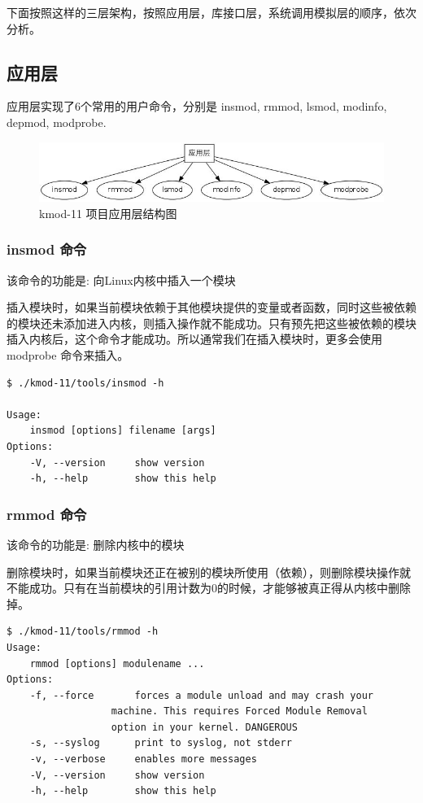 下面按照这样的三层架构，按照应用层，库接口层，系统调用模拟层的顺序，依次分析。

\subsection{应用层}

应用层实现了6个常用的用户命令，分别是 insmod, rmmod, lsmod, modinfo,
depmod, modprobe.

\begin{figure}[htbp]
\centering
\includegraphics{./figures/1-app.jpg}
\caption{kmod-11 项目应用层结构图}
\end{figure}

\subsubsection{insmod 命令}

该命令的功能是: 向Linux内核中插入一个模块

插入模块时，如果当前模块依赖于其他模块提供的变量或者函数，同时这些被依赖的模块还未添加进入内核，则插入操作就不能成功。只有预先把这些被依赖的模块插入内核后，这个命令才能成功。所以通常我们在插入模块时，更多会使用
modprobe 命令来插入。

{\begin{shaded}\begin{verbatim}
$ ./kmod-11/tools/insmod -h

Usage:
    insmod [options] filename [args]
Options:
    -V, --version     show version
    -h, --help        show this help
\end{verbatim}\end{shaded}}
\subsubsection{rmmod 命令}

该命令的功能是: 删除内核中的模块

删除模块时，如果当前模块还正在被别的模块所使用（依赖），则删除模块操作就不能成功。只有在当前模块的引用计数为0的时候，才能够被真正得从内核中删除掉。

{\begin{shaded}\begin{verbatim}
$ ./kmod-11/tools/rmmod -h
Usage:
    rmmod [options] modulename ...
Options:
    -f, --force       forces a module unload and may crash your
                  machine. This requires Forced Module Removal
                  option in your kernel. DANGEROUS
    -s, --syslog      print to syslog, not stderr
    -v, --verbose     enables more messages
    -V, --version     show version
    -h, --help        show this help
\end{verbatim}\end{shaded}}
